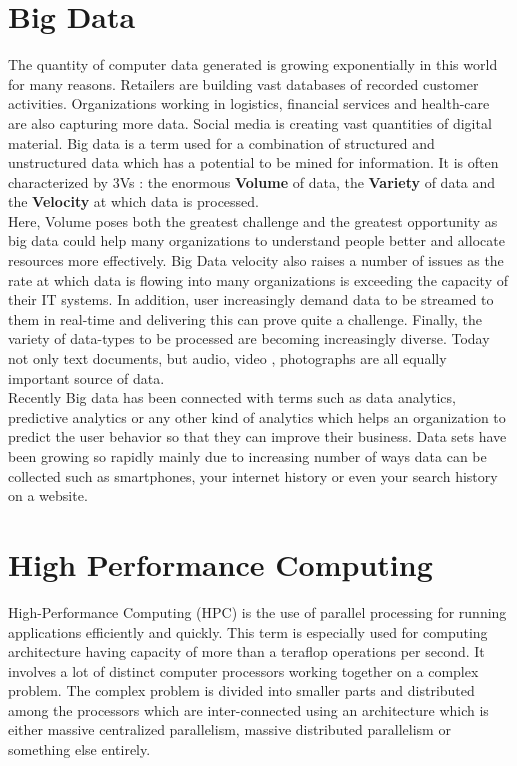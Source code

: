 \documentclass[sigconf]{acmart}
\begin{document}
\section{Big Data}
The quantity of computer data generated is growing exponentially in this world for many reasons. Retailers are building vast databases of recorded customer activities. Organizations working in logistics, financial services and health-care are also capturing more data. Social media is creating vast quantities of digital material. Big data is a term used for a combination of structured and unstructured data which has a potential to be mined for information.\cite{bigdatawiki} It is often characterized by 3Vs : the enormous \textbf{Volume} of data, the \textbf{Variety} of data and the \textbf{Velocity} at which data is processed. \\
Here, Volume poses both the greatest challenge and the greatest opportunity as big data could help  many organizations to understand people better and allocate resources more effectively. Big Data velocity also raises a number of issues as the rate at which data is flowing into many organizations is exceeding the capacity of their IT systems. In addition, user increasingly demand data to be streamed to them in real-time and delivering this can prove quite a challenge. Finally, the variety of data-types to be processed are becoming increasingly diverse. Today not only text documents, but audio, video , photographs are all equally important source of data.\cite{bigdatawiki}
\\
Recently Big data has been connected with terms such as data analytics, predictive analytics or any other kind of analytics which helps an organization to predict the user behavior so that they can improve their business. Data sets have been growing so rapidly mainly due to increasing number of ways data can be collected such as smartphones, your internet history or even your search history on a website.

\section{High Performance Computing}
High-Performance Computing (HPC) is the use of parallel processing for running applications efficiently and quickly.\cite{hpcwiki} This term is especially used for computing architecture having capacity of more than a teraflop operations per second. It involves a lot of distinct computer processors working together on a complex problem. The complex problem is divided into smaller parts and distributed among the processors which are inter-connected using an architecture which is either massive centralized parallelism, massive distributed parallelism or something else entirely. 
\end{document}
